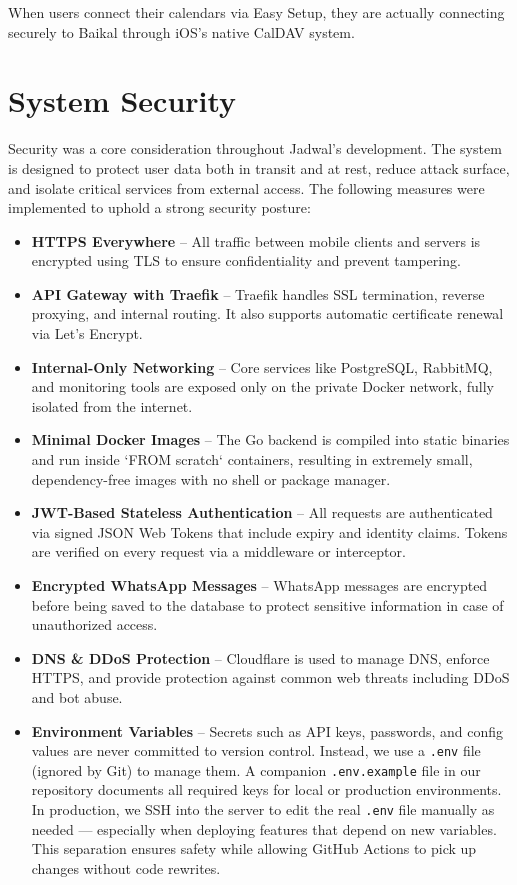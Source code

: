 When users connect their calendars via Easy Setup, they are actually connecting securely to Baikal through iOS’s native CalDAV system.

\section{System Security}

Security was a core consideration throughout Jadwal's development. The system is designed to protect user data both in transit and at rest, reduce attack surface, and isolate critical services from external access. The following measures were implemented to uphold a strong security posture:

\begin{itemize}
    \item \textbf{HTTPS Everywhere} – All traffic between mobile clients and servers is encrypted using TLS to ensure confidentiality and prevent tampering.
    \item \textbf{API Gateway with Traefik} – Traefik handles SSL termination, reverse proxying, and internal routing. It also supports automatic certificate renewal via Let's Encrypt.
    \item \textbf{Internal-Only Networking} – Core services like PostgreSQL, RabbitMQ, and monitoring tools are exposed only on the private Docker network, fully isolated from the internet.
    \item \textbf{Minimal Docker Images} – The Go backend is compiled into static binaries and run inside `FROM scratch` containers, resulting in extremely small, dependency-free images with no shell or package manager.
    \item \textbf{JWT-Based Stateless Authentication} – All requests are authenticated via signed JSON Web Tokens that include expiry and identity claims. Tokens are verified on every request via a middleware or interceptor.
    \item \textbf{Encrypted WhatsApp Messages} – WhatsApp messages are encrypted before being saved to the database to protect sensitive information in case of unauthorized access.
    \item \textbf{DNS \& DDoS Protection} – Cloudflare is used to manage DNS, enforce HTTPS, and provide protection against common web threats including DDoS and bot abuse.
    \item \textbf{Environment Variables} – Secrets such as API keys, passwords, and config values are never committed to version control. Instead, we use a \texttt{.env} file (ignored by Git) to manage them. A companion \texttt{.env.example} file in our repository documents all required keys for local or production environments. In production, we SSH into the server to edit the real \texttt{.env} file manually as needed — especially when deploying features that depend on new variables. This separation ensures safety while allowing GitHub Actions to pick up changes without code rewrites.

\end{itemize}

